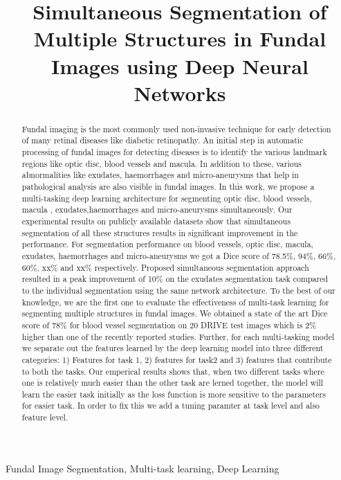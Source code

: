 \documentclass{article}
\title{Simultaneous Segmentation of Multiple Structures in Fundal Images using Deep Neural Networks}
\begin{document}
%
\maketitle
%
\begin{abstract}
Fundal imaging is the most commonly used non-invasive technique for early detection of many retinal diseases like diabetic retinopathy.
An initial step in automatic processing of fundal images for detecting diseases is to identify the various landmark regions like optic disc, blood vessels and macula.
In addition to these, various abnormalities like exudates, haemorrhages and micro-aneurysms that help in pathological analysis are also visible in fundal images.
In this work, we propose a multi-tasking deep learning architecture for segmenting optic disc, blood vessels, macula , exudates,haemorrhages and micro-aneurysms simultaneously.
Our experimental results on publicly available datasets show that simultaneous segmentation of all these structures results in significant improvement in the performance.
For segmentation performance on blood vessels, optic disc, macula, exudates, haemorrhages and  micro-aneurysms we got a Dice score of 78.5\%, 94\%, 66\%, 60\%, xx\% and xx\% respectively.
Proposed simultaneous segmentation approach resulted in a peak  improvement of 10\%  on the exudates segmentation task compared to the individual segmentation using the same network architecture.
To the best of our knowledge, we  are the first one to evaluate the effectiveness of  multi-task learning for segmenting multiple structures in fundal images.
We obtained a state of the art Dice score of 78\% for blood vessel segmentation on 20 DRIVE test images which is 2\% higher than one of the recently reported studies.
Further, for each multi-tasking model we separate out the features learned by the deep learning model into three different categories: 1) Features for task 1, 2) features for task2 and 3) features that contribute to both the tasks.
Our emperical results shows that, when two different tasks where one is relatively much easier than the other task are lerned together, the model will learn the easier task initially as the loss function is more sensitive to the parameters for easier task.
  In order to fix this we add a tuning paramter at task level and also feature level.
\end{abstract}
%
\begin{keywords}
Fundal Image Segmentation, Multi-task learning, Deep Learning
\end{keywords}
%
\end{document}
